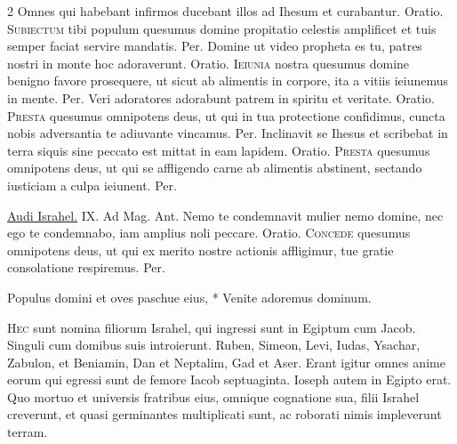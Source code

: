 \begin{multicols*}{2}
 Omnes qui habebant infirmos ducebant illos ad Ihesum et curabantur. {\color{Red} Oratio.}
\lettrine[lines=2]{\zallmancaps \color{Red} S}{ubiectum} tibi populum quesumus domine propitatio celestis amplificet et tuis semper faciat servire mandatis. Per.
 Domine ut video propheta es tu, patres nostri in monte hoc adoraverunt. {\color{Red} Oratio.}%
\lettrine[lines=2]{\zallmancaps \color{Red} I}{eiunia} nostra quesumus domine benigno favore prosequere, ut sicut ab alimentis in corpore, ita a vitiis ieiunemus in mente. Per.
 Veri adoratores adorabunt patrem in spiritu et veritate. {\color{Red} Oratio.}
\lettrine[lines=2]{\zallmancaps \color{Blue} P}{resta} quesumus omnipotens deus, ut qui in tua protectione confidimus, cuncta nobis adversantia te adiuvante vincamus. Per.
 Inclinavit se Ihesus et scribebat in terra siquis sine peccato est mittat in eam lapidem. {\color{Red} Oratio.}
\lettrine[lines=2]{\zallmancaps \color{Red} P}{resta} quesumus omnipotens deus, ut qui se affligendo carne ab alimentis abstinent, sectando iusticiam a culpa ieiunent. Per.
{\color{Red} }
\par {} \R \hyperlink{audi-israel}{Audi Israhel.} {\color{Red} IX. Ad Mag. Ant.} Nemo te condemnavit mulier nemo domine, nec ego te condemnabo, iam amplius noli peccare. {\color{Red} Oratio.}
\lettrine[lines=2]{\zallmancaps \color{Blue} C}{oncede} quesumus omnipotens deus, ut qui ex merito nostre actionis affligimur, tue gratie consolatione respiremus. Per.
\begin{invitatory}
{Populus domini et oves paschue eius, * Venite adoremus dominum.}
\end{invitatory}
\lettrine[lines=2]{\zallmancaps \color{Red} H}{ec} sunt nomina filiorum Israhel, qui ingressi sunt in Egiptum cum Jacob. Singuli cum domibus suis introierunt. Ruben, Simeon, Levi, Iudas, Ysachar, Zabulon, et Beniamin, Dan et Neptalim, Gad et Aser. Erant igitur omnes anime eorum qui egressi sunt de femore Iacob septuaginta. Ioseph autem in Egipto erat. Quo mortuo et universis fratribus eius, omnique cognatione sua, filii Israhel creverunt, et quasi germinantes multiplicati sunt, ac roborati nimis impleverunt terram. \R

\end{multicols*}
